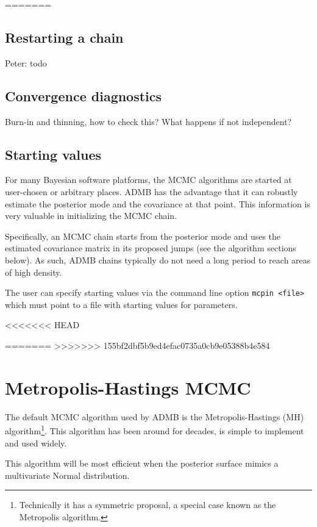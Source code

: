 \documentclass{article}\usepackage[]{graphicx}\usepackage[]{color}
\begin{document}

=======
\subsection{Restarting a chain}\label{sec:restart}
Peter: todo
\subsection{Convergence diagnostics} \label{sec:diag}
Burn-in and thinning, how to check this? What happens if not
independent?

\subsection{Starting values}\label{sec:startvals}
For many Bayesian software platforms, the MCMC algorithms
are started at user-chosen or arbitrary places. ADMB has the
advantage that it can robustly estimate the posterior mode
and the covariance at that point. This information is very
valuable in initializing the MCMC chain.

Specifically, an MCMC chain starts from the posterior mode
and uses the estimated covariance matrix in its proposed
jumps (see the algorithm sections below). As such, ADMB
chains typically do not need a long period to reach areas of
high density.

The user can specify starting values via the command line
option \texttt{mcpin <file>} which must point to a file with
starting values for parameters.

<<<<<<< HEAD


=======
>>>>>>> 155bf2dbf5b9ed4efac0735a0cb9e05388b4e584
\section{Metropolis-Hastings MCMC}\label{sec:MH}
The default MCMC algorithm used by ADMB is the
Metropolis-Hastings (MH) algorithm\footnote{Technically it
  has a symmetric proposal, a special case known as the
  Metropolis algorithm.}. This algorithm has been around for
decades, is simple to implement and used widely.

This algorithm will be most efficient when the posterior
surface mimics a multivariate Normal distribution.
\end{document}
